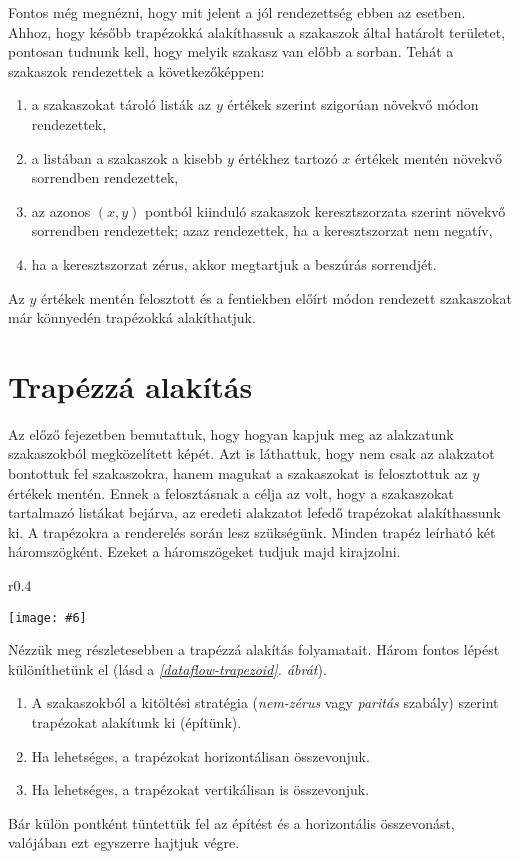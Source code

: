 \documentclass[12pt]{report}
\makeatletter
\theoremstyle{definition}
\newcommand{\melyikoldalra}{r}
\newlength{\Xoffset}
\newlength{\Yoffset}
\newcommand*{\setpdfoffset}[2]{%
  \setlength{\Xoffset}{#1}%
  \setlength{\Yoffset}{#2}%
}
\newcommand*{\setviewport}[4]{%
  \def\x@viewport{%
    {\the\dimexpr#1-\Xoffset}
    {\the\dimexpr#2-\Yoffset}
    {\the\dimexpr#3-\Xoffset}
    {\the\dimexpr#4-\Yoffset}%
  }%
}
\newcommand{\includegraphicskivagas}[6]{
    \setpdfoffset{0pt}{0pt}
    \setviewport{#1}{#2}{#3}{#4}
    \texttt{[image: \#6]}
}
\newcommand{\includedataflowkivagas}[5]{
    \includegraphicskivagas{#1}{#2}{#3}{#4}{scale=0.6,#5}
    {img/built/dataflow_eps}
}
\makeatother
\begin{document}
Fontos még megnézni, hogy mit jelent a jól rendezettség ebben az esetben.
Ahhoz, hogy később trapézokká alakíthassuk a szakaszok által határolt
területet, pontosan tudnunk kell, hogy melyik szakasz van előbb a sorban. Tehát
a szakaszok rendezettek a következőképpen:
  \begin{enumerate}
    \item a szakaszokat tároló listák az $y$ értékek szerint szigorúan
    növekvő módon rendezettek,
    \item a listában a szakaszok a kisebb $y$ értékhez tartozó $x$
    értékek mentén növekvő sorrendben rendezettek,
    \item az azonos $(x, y)$ pontból kiinduló szakaszok keresztszorzata
    szerint növekvő sorrendben rendezettek; azaz rendezettek, ha a
    keresztszorzat nem negatív,
    \item ha a keresztszorzat zérus, akkor megtartjuk a beszúrás sorrendjét.
  \end{enumerate}

Az $y$ értékek mentén felosztott és a fentiekben előírt módon rendezett
szakaszokat már könnyedén trapézokká alakíthatjuk.

  \section{Trapézzá alakítás}

Az előző fejezetben bemutattuk, hogy hogyan kapjuk meg az alakzatunk
szakaszokból megközelített képét. Azt is láthattuk, hogy nem csak az alakzatot
bontottuk fel szakaszokra, hanem magukat a szakaszokat is felosztottuk az $y$
értékek mentén. Ennek a felosztásnak a célja az volt, hogy a szakaszokat
tartalmazó listákat bejárva, az eredeti alakzatot lefedő trapézokat
alakíthassunk ki. A trapézokra a renderelés során lesz szükségünk. Minden
trapéz leírható két háromszögként. Ezeket a háromszögeket tudjuk majd
kirajzolni.

  \begin{wrapfigure}{\melyikoldalra}{0.4\textwidth}
    \begin{center}
      \includedataflowkivagas{345pt}{200pt}{525pt}{393pt}{}
    \end{center}
    \caption{\label{dataflow-trapezoid} A trapézzá alakítás és
    összevonás lépései. \\ (Részlet a \emph{\ref{dataflow}. folyamatábrából}.)}
  \end{wrapfigure}

Nézzük meg részletesebben a trapézzá alakítás folyamatait. Három fontos lépést
különíthetünk el (lásd a \emph{\ref{dataflow-trapezoid}. ábrát}).
  \begin{enumerate}
    \item A szakaszokból a kitöltési stratégia (\emph{nem-zérus} vagy
    \emph{paritás} szabály) szerint trapézokat alakítunk ki (építünk).
    \item Ha lehetséges, a trapézokat horizontálisan összevonjuk.
    \item Ha lehetséges, a trapézokat vertikálisan is összevonjuk.
  \end{enumerate}
Bár külön pontként tüntettük fel az építést és a horizontális összevonást,
valójában ezt egyszerre hajtjuk végre.
\end{document}
